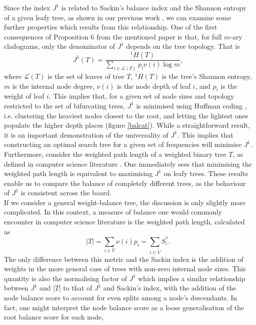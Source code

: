 \iffalse
Since the index $J^1$ is related to Sackin's balance index and the Shannon entropy of a given leafy tree, as shown in our previous work \cite{lemant_robust_2021}, we can examine some further properties which results from this relationship. One of the first consequences of Proposition $6$ from the mentioned paper is that, for full $m$-ary cladograms, only the denominator of $J^1$ depends on the tree topology. That is
\begin{equation}
    J^1(T) = \frac{^1H(T)}{\sum_{i\in\mathcal{L}(T)}p_i\nu(i)\log m}, \label{prop6}
\end{equation}
where $\mathcal{L}(T)$ is the set of leaves of tree $T$, $^1H(T)$ is the tree's Shannon entropy, $m$ is the internal node degree, $\nu(i)$ is the node depth of leaf $i$, and $p_i$ is the weight of leaf $i$. This implies that, for a given set of node sizes and topology restricted to the set of bifurcating trees, $J^1$ is minimised using Huffman coding \cite{huffman_method_nodate}, i.e. clustering the heaviest nodes closest to the root, and letting the lightest ones populate the higher depth places (figure \ref{balcat}). While a straightforward result, it is an important demonstration of the universality of $J^1$. This implies that constructing an optimal search tree for a given set of frequencies will minimise $J^1$. Furthermore, consider the weighted path length of a weighted binary tree $T$, as defined in computer science literature \cite{nievergelt_binary_nodate}. One immediately sees that minimising the weighted path length is equivalent to maximising $J^1$ on leafy trees. These results enable us to compare the balance of completely different trees, as the behaviour of $J^1$ is consistent across the board. \\
If we consider a general weight-balance tree, the discussion is only slightly more complicated. In this context, a measure of balance one would commonly encounter in computer science literature is the weighted path length, calculated as 
\begin{equation}\label{weightedPL}
    |T| = \sum_{i\in V} \nu(i) p_i = \sum_{i\in\tilde{V}}S_i^*.
\end{equation}
The only difference between this metric and the Sackin index is the addition of weights in the more general case of trees with non-zero internal node sizes. This quantity is also the normalising factor of $J^1$ which implies a similar relationship between $J^1$ and $|T|$ to that of $J^1$ and Sackin's index, with the addition of the node balance score to account for even splits among a node's descendants. In fact, one might interpret the node balance score as a loose generalisation of the root balance score for each node,
